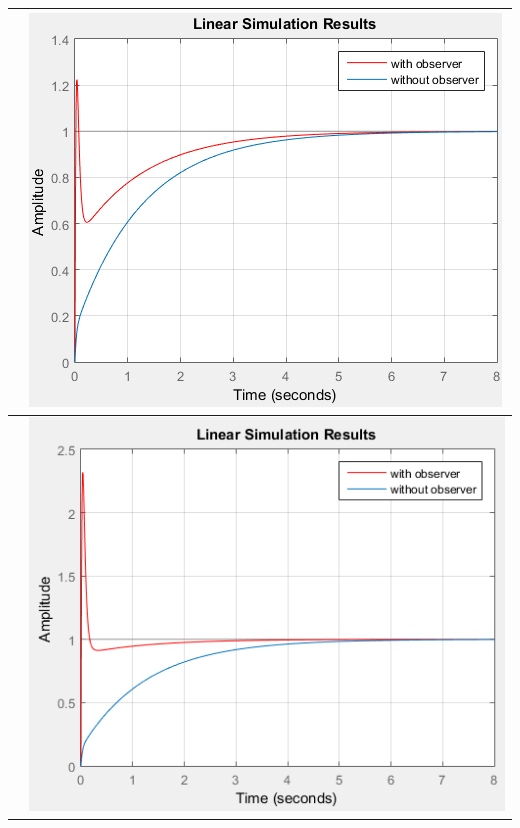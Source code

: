 \documentclass[14pt,a4paper,report]{report}
\begin{document}
\begin{table}[h!]
\begin{tabular}{ | m{4cm} | m{8cm} | }
		\text{$k_0=31.623$, $k_1=16.088$}\linebreak \text{$\alpha=-16$, $\beta=-32$, $\gamma=0.4$} & 
		\begin{minipage}{.3\textwidth}
			\includegraphics[scale = 0.48]{images/e3.png}
		\end{minipage}
		\\\hline
		
		\text{$k_0=31.623$, $k_1=16.088$}\linebreak \text{$\alpha=-16$, $\beta=-32$, $\gamma=0.8$} & 
		\begin{minipage}{.3\textwidth}
			\includegraphics[scale = 0.48]{images/e4.png}
		\end{minipage}
		\\\hline
		
	\end{tabular}
	\egroup
\end{table}
\end{document}
